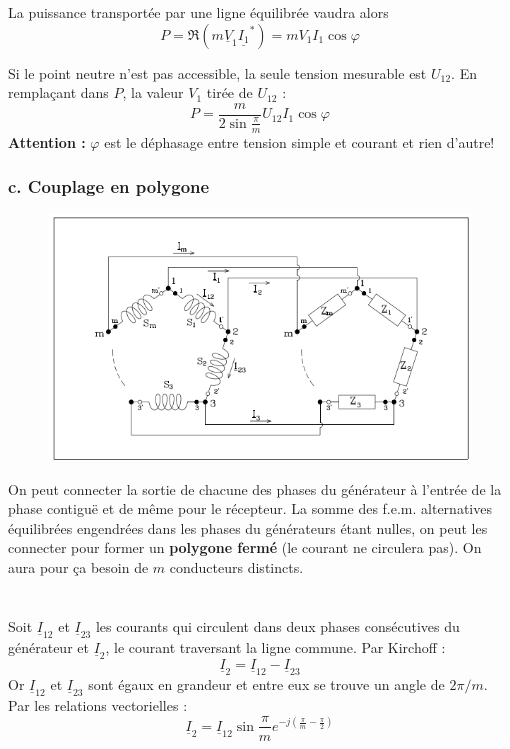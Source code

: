 La puissance transportée par une ligne équilibrée vaudra alors 
\begin{equation}
	P = \Re(m \underline{V}_1\underline{I_1}^*) = mV_1I_1\cos\varphi
\end{equation}
		
Si le point neutre n'est pas accessible, la seule tension mesurable 
est $U_{12}$. En remplaçant dans $P$, la valeur $V_1$ tirée de 
$U_{12}$ :
\begin{equation}
	P = \frac{m}{2\sin\frac{\pi}{m}}U_{12}I_1\cos\varphi
\end{equation}
\textbf{Attention :} $\varphi$ est le déphasage entre tension simple 
et courant et rien d'autre!
		
		
\subsubsection{c. Couplage en polygone}
\begin{figure}
	\vspace{-5mm}
	\includegraphics[scale=0.4]{ch1/image8.png}
\end{figure}		
On peut connecter la sortie de chacune des phases du générateur à 
l'entrée de la phase contiguë et de même pour le récepteur. La somme 
des f.e.m. alternatives équilibrées engendrées dans les phases du 
générateurs étant nulles, on peut les connecter pour former un 
\textbf{polygone fermé} (le courant ne circulera pas). On aura pour ça
besoin de $m$ conducteurs distincts.\\
\ \\
\\

Soit $\underline{I}_{12}$ et $\underline{I}_{23}$ les courants qui 
circulent dans deux phases consécutives du générateur et $\underline{I}_
2$, le courant traversant la ligne commune. Par Kirchoff :
\begin{equation}
	\underline{I}_2 = \underline{I}_{12}-\underline{I}_{23}
\end{equation}
Or $\underline{I}_{12}$ et $\underline{I}_{23}$  sont égaux en 
grandeur et entre eux se trouve un angle de $2\pi/m$. Par les 
relations vectorielles :
\begin{equation}
	\underline{I}_2 = \underline{I}_{12}\sin\frac{\pi}{m}e^{-j\left(\frac{
		\pi}{m}-\frac{\pi}{2}\right)}
\end{equation} 
		
